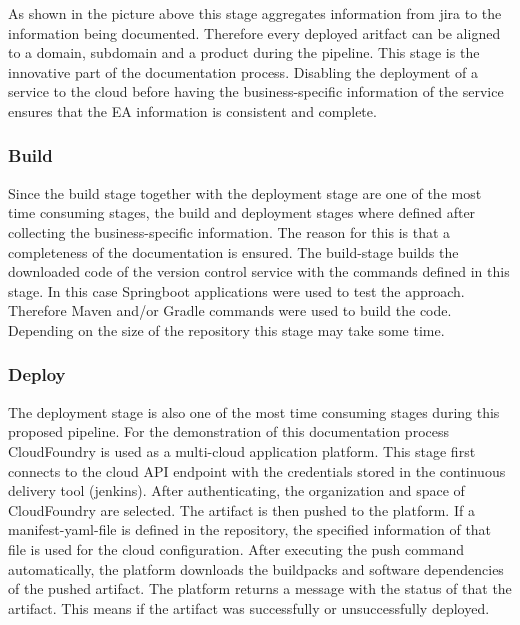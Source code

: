 As shown in the picture above this stage aggregates information from jira to the information being documented. Therefore every deployed aritfact can be aligned to a domain, subdomain and a product during the pipeline. This stage is the innovative part of the documentation process. Disabling the deployment of a service to the cloud before having the business-specific information of the service ensures that the EA information is consistent and complete. 

\subsubsection{Build}
Since the build stage together with the deployment stage are one of the most time consuming stages, the build and deployment stages where defined after collecting the business-specific information. The reason for this is that a completeness of the documentation is ensured. 
The build-stage builds the downloaded code of the version control service with the commands defined in this stage. In this case Springboot applications were used to test the approach. Therefore Maven and/or Gradle commands were used to build the code. Depending on the size of the repository this stage may take some time.

\subsubsection{Deploy}
The deployment stage is also one of the most time consuming stages during this proposed pipeline. For the demonstration of this documentation process CloudFoundry is used as a multi-cloud application platform. This stage first connects to the cloud API endpoint with the credentials stored in the continuous delivery tool (jenkins). After authenticating, the organization and space of CloudFoundry are selected. The artifact is then pushed to the platform. If a manifest-yaml-file is defined in the repository, the specified information of that file is used for the cloud configuration. After executing the push command automatically, the platform downloads the buildpacks and software dependencies of the pushed artifact. The platform returns a message with the status of that the artifact. This means if the artifact was successfully or unsuccessfully deployed.

